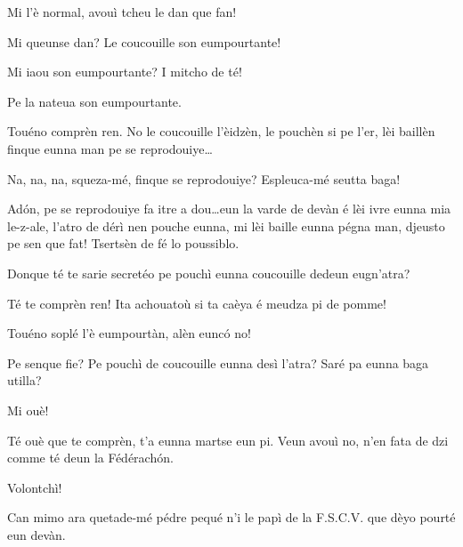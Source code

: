 \begin{drama}
\Tuenospeaks Mi l'è normal, avouì tcheu le dan que fan!

\Richardspeaks Mi queunse dan? Le coucouille son eumpourtante! 

\Tuenospeaks Mi iaou son eumpourtante? I mitcho de té!

\Gerominespeaks Pe la nateua son eumpourtante.

\Richardspeaks{} Touéno comprèn ren. No le coucouille l'èidzèn, le pouchèn si pe l'er, lèi baillèn finque eunna man pe se reprodouiye\ldots

\Tuenospeaks{} Na, na, na, squeza-mé, finque se reprodouiye? Espleuca-mé seutta baga!

\Richardspeaks Ad\'on, pe se reprodouiye fa itre a dou\ldots eun la varde de devàn é lèi ivre eunna mia le-z-ale, l'atro de dérì nen pouche eunna, mi lèi baille eunna pégna man, djeusto pe sen que fat! Tsertsèn de fé lo poussiblo.

\Tuenospeaks Donque té te sarie secretéo pe pouchì eunna coucouille dedeun eugn'atra?

\Richardspeaks Té te comprèn ren! Ita achouatoù si ta caèya é meudza pi de pomme!

\Gerominespeaks{} Touéno soplé l'è eumpourtàn, alèn eunc\'o no!

\Tuenospeaks Pe senque fie? Pe pouchì de coucouille eunna desì l'atra? Saré pa eunna baga utilla?

\Gerominespeaks Mi ouè!

\Richardspeaks{} Té ouè que te comprèn, t'a eunna martse eun pi. Veun avouì no, n'en fata de dzi comme té deun la Fédérach\'on.

\Gerominespeaks Volontchì!


\Richardspeaks Can mimo ara quetade-mé pédre pequé n'i le papì de la F.S.C.V. que dèyo pourté eun devàn.






\end{drama}
